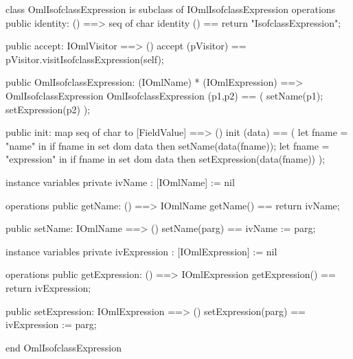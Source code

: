 \begin{vdm_al}
class OmlIsofclassExpression is subclass of IOmlIsofclassExpression
operations
  public identity: () ==> seq of char
  identity () == return "IsofclassExpression";

  public accept: IOmlVisitor ==> ()
  accept (pVisitor) == pVisitor.visitIsofclassExpression(self);

  public OmlIsofclassExpression:
      (IOmlName) *
      (IOmlExpression) ==> OmlIsofclassExpression
  OmlIsofclassExpression (p1,p2) == 
   ( setName(p1);
     setExpression(p2) );

  public init: map seq of char to [FieldValue] ==> ()
  init (data) ==
    ( let fname = "name" in
        if fname in set dom data
        then setName(data(fname));
      let fname = "expression" in
        if fname in set dom data
        then setExpression(data(fname)) );

instance variables
  private ivName : [IOmlName] := nil

operations
  public getName: () ==> IOmlName
  getName() == return ivName;

  public setName: IOmlName ==> ()
  setName(parg) == ivName := parg;

instance variables
  private ivExpression : [IOmlExpression] := nil

operations
  public getExpression: () ==> IOmlExpression
  getExpression() == return ivExpression;

  public setExpression: IOmlExpression ==> ()
  setExpression(parg) == ivExpression := parg;

end OmlIsofclassExpression
\end{vdm_al}

